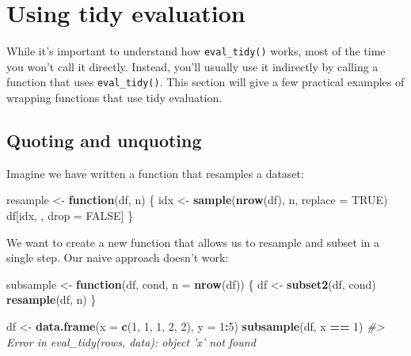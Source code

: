 \documentclass[]{book}
\newenvironment{Shaded}{\begin{snugshade}}{\end{snugshade}}
\newcommand{\CommentTok}[1]{\textcolor[rgb]{0.37,0.37,0.37}{\textit{#1}}}
\newcommand{\ControlFlowTok}[1]{\textcolor[rgb]{0.27,0.27,0.27}{\textbf{#1}}}
\newcommand{\DataTypeTok}[1]{\textcolor[rgb]{0.27,0.27,0.27}{#1}}
\newcommand{\DecValTok}[1]{\textcolor[rgb]{0.06,0.06,0.06}{#1}}
\newcommand{\KeywordTok}[1]{\textcolor[rgb]{0.27,0.27,0.27}{\textbf{#1}}}
\newcommand{\NormalTok}[1]{#1}
\newcommand{\OperatorTok}[1]{\textcolor[rgb]{0.43,0.43,0.43}{\textbf{#1}}}
\newcommand{\OtherTok}[1]{\textcolor[rgb]{0.37,0.37,0.37}{#1}}
\newcommand{\StringTok}[1]{\textcolor[rgb]{0.5,0.5,0.5}{#1}}
\begin{document}
\hypertarget{tidy-evaluation}{%
\section{Using tidy evaluation}\label{tidy-evaluation}}

While it's important to understand how \texttt{eval\_tidy()} works, most of the time you won't call it directly. Instead, you'll usually use it indirectly by calling a function that uses \texttt{eval\_tidy()}. This section will give a few practical examples of wrapping functions that use tidy evaluation.

\hypertarget{quoting-and-unquoting}{%
\subsection{Quoting and unquoting}\label{quoting-and-unquoting}}


Imagine we have written a function that resamples a dataset:

\begin{Shaded}
\begin{Highlighting}[]
\NormalTok{resample <-}\StringTok{ }\ControlFlowTok{function}\NormalTok{(df, n) \{}
\NormalTok{  idx <-}\StringTok{ }\KeywordTok{sample}\NormalTok{(}\KeywordTok{nrow}\NormalTok{(df), n, }\DataTypeTok{replace =} \OtherTok{TRUE}\NormalTok{)}
\NormalTok{  df[idx, , drop =}\StringTok{ }\OtherTok{FALSE}\NormalTok{]}
\NormalTok{\}}
\end{Highlighting}
\end{Shaded}

We want to create a new function that allows us to resample and subset in a single step. Our naive approach doesn't work:

\begin{Shaded}
\begin{Highlighting}[]
\NormalTok{subsample <-}\StringTok{ }\ControlFlowTok{function}\NormalTok{(df, cond, }\DataTypeTok{n =} \KeywordTok{nrow}\NormalTok{(df)) \{}
\NormalTok{  df <-}\StringTok{ }\KeywordTok{subset2}\NormalTok{(df, cond)}
  \KeywordTok{resample}\NormalTok{(df, n)}
\NormalTok{\}}

\NormalTok{df <-}\StringTok{ }\KeywordTok{data.frame}\NormalTok{(}\DataTypeTok{x =} \KeywordTok{c}\NormalTok{(}\DecValTok{1}\NormalTok{, }\DecValTok{1}\NormalTok{, }\DecValTok{1}\NormalTok{, }\DecValTok{2}\NormalTok{, }\DecValTok{2}\NormalTok{), }\DataTypeTok{y =} \DecValTok{1}\OperatorTok{:}\DecValTok{5}\NormalTok{)}
\KeywordTok{subsample}\NormalTok{(df, x }\OperatorTok{==}\StringTok{ }\DecValTok{1}\NormalTok{)}
\CommentTok{#> Error in eval_tidy(rows, data): object 'x' not found}
\end{Highlighting}
\end{Shaded}
\end{document}
